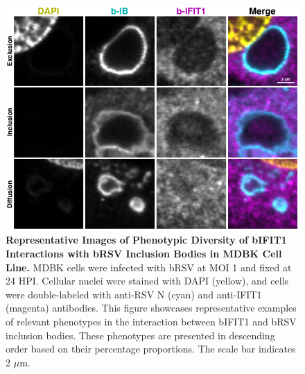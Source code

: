 \begin{figure}
    \centering
    \includegraphics[width=1\linewidth]{08. Chapter 3/Figs/02. Infection/01. IFIT1/09. mdbk i1.pdf}
    \caption[Representative Images of Phenotypic Diversity of bIFIT1 Interactions with bRSV Inclusion Bodies in MDBK Cell Line.]{\textbf{Representative Images of Phenotypic Diversity of bIFIT1 Interactions with bRSV Inclusion Bodies in MDBK Cell Line.} MDBK cells were infected with bRSV at MOI 1 and fixed at 24 HPI. Cellular nuclei were stained with DAPI (yellow), and cells were double-labeled with anti-RSV N (cyan) and anti-IFIT1 (magenta) antibodies. This figure showcases representative examples of relevant phenotypes in the interaction between bIFIT1 and bRSV inclusion bodies. These phenotypes are presented in descending order based on their percentage proportions. The scale bar indicates 2 \(\mu \mbox{m}\).}
    \label{fig:Representative Images of Phenotypic Diversity of bIFIT1 Interactions with bRSV Inclusion Bodies in MDBK Cell Line}
\end{figure}

